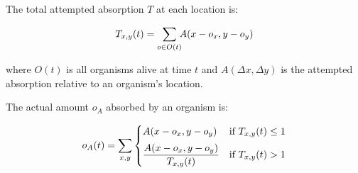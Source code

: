 \documentclass{article}
\begin{document}

\begin{comment}
Selective pressure can favor a gene for altruistic behavior even in a
community of takers who give nothing back, even when the behavior
results in the giver having no offspring, even when there is no
mechanism to detect or punish takers who give nothing back, and even
when givers must compete with their own beneficiaries for the
resources needed for giving. Three conditions suffice to produce this
selective pressure: (1) the gene encodes only a probability of
engaging in the giving behavior; (2) benefits from the behavior
decrease with distance from the giver; and (3) the total benefit to
the giver's neighbors exceeds the cost to the giver. A population
under these conditions tends to contain a stable range of variation in
alleles that code for different probabilities of the giving behavior,
in some cases producing castes centered at different probabilities. In
effect, alleles for varying degrees of giving produce partial clones
who are partially sterile in proportion to their giving. Such alleles
represent a continuum between the sterile castes of social insects, or
somatic cells in multicellular organisms (100\% clones, 100\% givers,
100\% sterile), and organisms that try to maximize inclusive fitness
entirely through their own offspring. The selective pressure favoring
partial givers provides a genetic explanation for some forms of group
selection, and predicts as-yet-unexplored correlations between
communal giving and sterility.

\end{comment}

The total attempted absorption $T$ at each location is:

$$
T_{x,y}(t) = \sum\limits_{o \in O(t)} \kern-4pt A(x - o_x, y - o_y)
$$

\noindent
where $O(t)$ is all organisms alive at time $t$ and $A(\Delta x, \Delta y)$
is the attempted absorption relative to an organism's location.

The actual amount $o_A$ absorbed by an organism is:

$$
o_A(t) = \sum\limits_{x,y} \begin{cases}
A(x - o_x, y - o_y)  &  \mbox{if }T_{x,y}(t) \leq 1  \\
\noalign{\vskip 0.5em}
\dfrac{A(x - o_x, y - o_y)}{T_{x,y}(t)}  & \mbox{if }T_{x,y}(t) > 1
\end{cases}
$$
\end{document}
